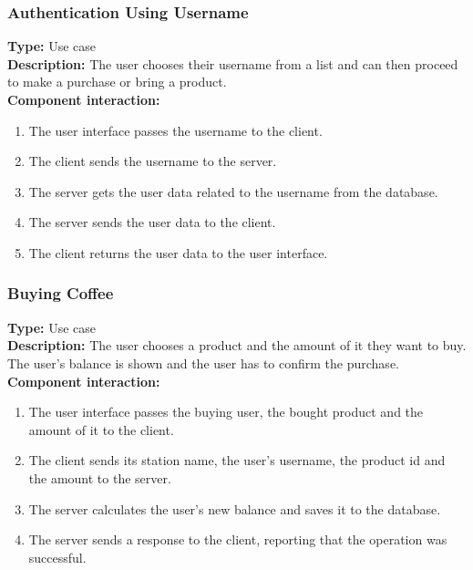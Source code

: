\documentclass[11pt]{article}
\begin{document}
\subsubsection{Authentication Using Username}
\textbf{Type:} Use case\\
\textbf{Description:} The user chooses their username from a list and can then proceed to make a purchase or bring a product.\\
\textbf{Component interaction:} 
\begin{enumerate} 
\item{The user interface passes the username to the client.}
\item{The client sends the username to the server.}
\item{The server gets the user data related to the username from the database.}
\item{The server sends the user data to the client.}
\item{The client returns the user data to the user interface.}
\end{enumerate}

\subsubsection{Buying Coffee}
\textbf{Type:} Use case\\
\textbf{Description:} The user chooses a product and the amount of it they want to buy. 
The user's balance is shown and the user has to confirm the purchase.\\
\textbf{Component interaction:}
\begin{enumerate} 
\item{The user interface passes the buying user, the bought product and the amount of it to the client.}
\item{The client sends its station name, the user's username, the product id and the amount to the server.}
\item{The server calculates the user's new balance and saves it to the database.}
\item{The server sends a response to the client, reporting that the operation was successful.}
\end{enumerate}
\end{document}
